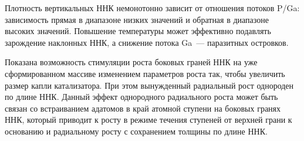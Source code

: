 Плотность вертикальных ННК немонотонно зависит от отношения потоков P/Ga:
зависимость прямая в диапазоне низких значений и обратная в диапазоне высоких
значений. Повышение температуры может эффективно подавлять зарождение наклонных
ННК, а снижение потока Ga~--- паразитных островков.

Показана возможность стимуляции роста боковых граней ННК на уже сформированном
массиве изменением параметров роста так, чтобы увеличить размер капли
катализатора. При этом вынужденный радиальный рост однороден по длине ННК.
Данный эффект однородного радиального роста может быть связан со встраиванием
адатомов в край атомной ступени на боковых гранях ННК, который приводит к росту
в режиме течения ступеней от верхней грани к основанию и радиальному росту с
сохранением толщины по длине ННК.

\FloatBarrier

